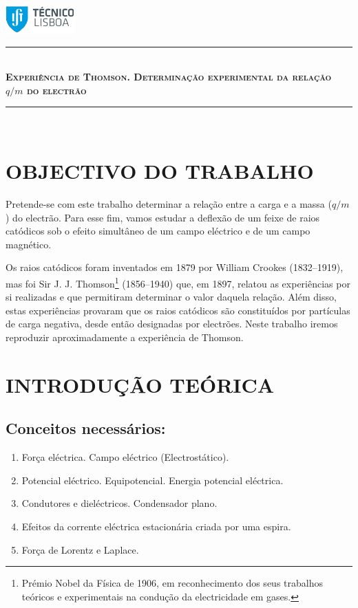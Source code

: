 \documentclass[a4paper,twoside,12pt]{article}      %
\author{Prof. Bernardo B. Carvalho}
\date{ Setembro 2014}
\newcommand{\HRule}{\rule{\linewidth}{0.5mm}}
\begin{document}
 

\includegraphics[width=0.2\textwidth]{../../logo-ist}%

\HRule \\[0.5cm]
{ \large   \bfseries \textsc{ Experiência de Thomson. Determinação experimental da relação $q/m$ do electrão }}\\
\HRule \\%

\section{\sf OBJECTIVO DO TRABALHO}
Pretende-se com este trabalho determinar a relação entre a carga e a massa ($q/m$) do electrão. Para esse fim, vamos estudar a deflexão de um feixe de raios catódicos sob o efeito simultâneo de um campo eléctrico e de um campo magnético.

Os raios catódicos foram inventados em 1879 por William Crookes (1832--1919), mas foi Sir J. J. Thomson\footnote{Prémio Nobel da Física de 1906, em reconhecimento dos seus trabalhos teóricos e experimentais na condução da electricidade em gases.} (1856--1940) que, em 1897, relatou as experiências por si realizadas e que permitiram determinar o valor daquela relação. Além disso, estas experiências provaram que os raios catódicos são constituídos por partículas de carga negativa, desde então designadas por electrões. Neste trabalho iremos reproduzir aproximadamente a experiência de Thomson.

\section{\sf INTRODUÇÃO TEÓRICA}
\subsection{\sf  Conceitos necessários:} 
\begin{enumerate}
	\item Força eléctrica. Campo eléctrico (Electrostático).
	\item Potencial eléctrico. Equipotencial. Energia potencial eléctrica.
	\item Condutores e dieléctricos. Condensador plano.
	\item Efeitos da corrente eléctrica estacionária criada por uma espira. 	
	\item Força de Lorentz e Laplace.
\end{enumerate}
\end{document}
